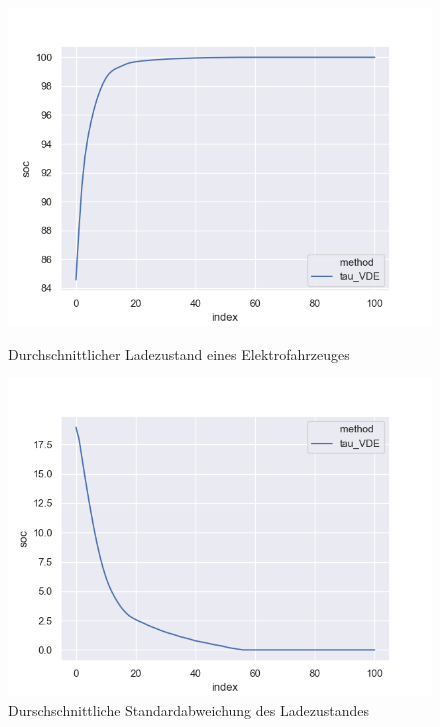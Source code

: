 \begin{figure}[htb]
	\centering
	\begin{minipage}[t]{0.49\linewidth}
		\centering
        \includegraphics[width=\linewidth]{img/VDE_tau/tau_VDE_2_soc_mean.png}
        \caption{Durchschnittlicher Ladezustand eines Elektrofahrzeuges}
        \label{ABB_VDEtauSocMEAN}
	\end{minipage}
	\hfill
	\begin{minipage}[t]{0.49\linewidth}
		\centering
        \includegraphics[width=\linewidth]{img/VDE_tau/tau_VDE_2_soc_std.png}
        \caption{Durschschnittliche Standardabweichung des Ladezustandes}
        \label{ABB_VDEtauSocSTD}
	\end{minipage}
\end{figure}

